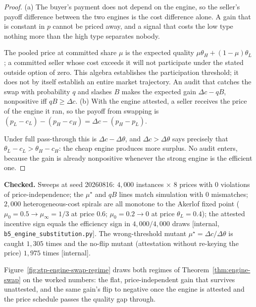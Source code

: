 \documentclass[11pt,a4paper]{article}
\theoremstyle{definition}
\begin{document}
\begin{proof}
\setlength{\parskip}{4pt plus 1pt}
(a) The buyer's payment does not depend on the engine, so the seller's payoff
difference between the two engines is the cost difference alone. A gain that
is constant in $p$ cannot be priced away, and a signal that costs the low type
nothing more than the high type separates nobody.

The pooled price at
committed share $\mu$ is the expected quality $\mu\theta_H+(1-\mu)\theta_L$;
a committed seller whose cost exceeds it will not participate under the
stated outside option of zero. This algebra establishes the participation
threshold; it does not by itself establish an entire market trajectory. An audit that catches the
swap with probability $q$ and slashes $B$ makes the expected gain
$\Delta c-qB$, nonpositive iff $qB\ge\Delta c$.
(b) With the engine attested, a seller receives the price of the engine it
ran, so the payoff from swapping is $(p_L-c_L)-(p_H-c_H)=\Delta c-(p_H-p_L)$.


Under full pass-through this is $\Delta c-\Delta\theta$, and
$\Delta c>\Delta\theta$ says precisely that $\theta_L-c_L>\theta_H-c_H$: the
cheap engine produces more surplus. No audit enters, because the gain is
already nonpositive whenever the strong engine is the efficient one.
\end{proof}

\noindent\textbf{Checked.} Sweeps at seed 20260816: $4{,}000$ instances
$\times$ $8$ prices with $0$ violations of price-independence; the
$\mu^\star$ and $qB$ lines match simulation with $0$ mismatches; $2{,}000$
heterogeneous-cost spirals are all monotone to the Akerlof fixed point
($\mu_0=0.5\to\mu_\infty=1/3$ at price $0.6$; $\mu_0=0.2\to 0$ at price
$\theta_L=0.4$); the attested incentive sign equals the efficiency sign in
$4{,}000/4{,}000$ draws [internal, \texttt{b5\_engine\_substitution.py}].
The wrong-threshold mutant $\mu^\star=\Delta c/\Delta\theta$ is caught
$1{,}305$ times and the no-flip mutant (attestation without re-keying the
price) $1{,}975$ times [internal].



Figure~\ref{fig:stp-engine-swap-regime} draws both regimes of
Theorem~\ref{thm:engine-swap} on the worked numbers: the flat, price-independent
gain that survives unattested, and the same gain's flip to negative once the
engine is attested and the price schedule passes the quality gap through.


\end{document}
